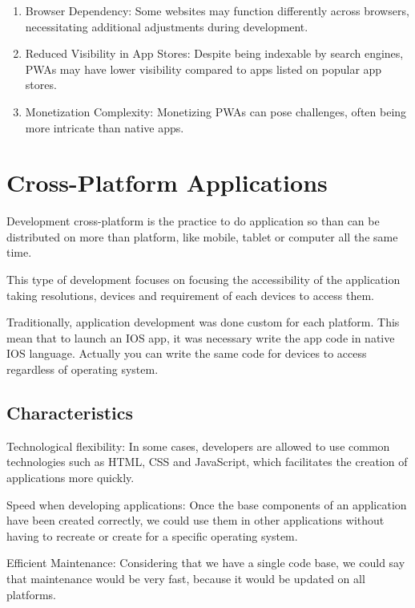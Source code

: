 \documentclass[12pt,a4paper, twosite]{article}
\begin{document}
\begin{enumerate}
	\item Browser Dependency: Some websites may function differently across browsers, necessitating additional adjustments during development.
	
	\item Reduced Visibility in App Stores: Despite being indexable by search engines, PWAs may have lower visibility compared to apps listed on popular app stores.
	
	\item Monetization Complexity: Monetizing PWAs can pose challenges, often being more intricate than native apps.
\end{enumerate}

	\section{Cross-Platform Applications }
	\label{sec:specific-requirements}
	
	Development cross-platform is the practice to do application so than can be distributed on more than platform, like mobile, tablet or computer all the same time.
	
	This type of development focuses on focusing the accessibility of the application taking resolutions, devices and requirement of each devices to access them.
	
	Traditionally, application development was done custom for each platform. This mean that to launch  an IOS app, it was necessary write the app code in native IOS language. Actually you can write the same code for  devices to access regardless of operating system.
	\subsection{Characteristics}
	\label{sec:product-functions}
	
Technological flexibility: In some cases, developers are allowed to use common technologies such as HTML, CSS and JavaScript, which facilitates the creation of applications more quickly.

Speed when developing applications: Once the base components of an application have been created correctly, we could use them in other applications without having to recreate or create for a specific operating system.

Efficient Maintenance: Considering that we have a single code base, we could say that maintenance would be very fast, because it would be updated on all platforms.
\end{document}
